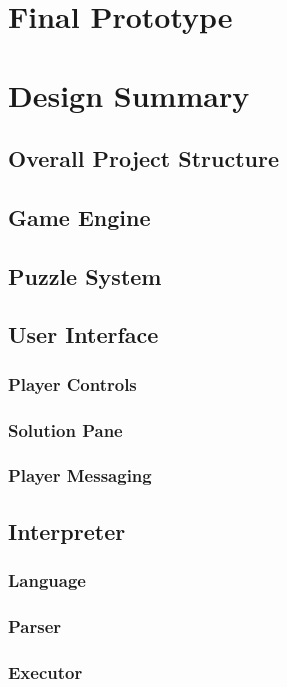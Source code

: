 \documentclass{article}
\begin{document}
\newpage
\section{Final Prototype}

\newpage
\section{Design Summary}

\subsection{Overall Project Structure}

\subsection{Game Engine}

\subsection{Puzzle System}

\subsection{User Interface}
\subsubsection{Player Controls}
\subsubsection{Solution Pane}
\subsubsection{Player Messaging}

\subsection{Interpreter}
\subsubsection{Language}
\subsubsection{Parser}
\subsubsection{Executor}
\end{document}
